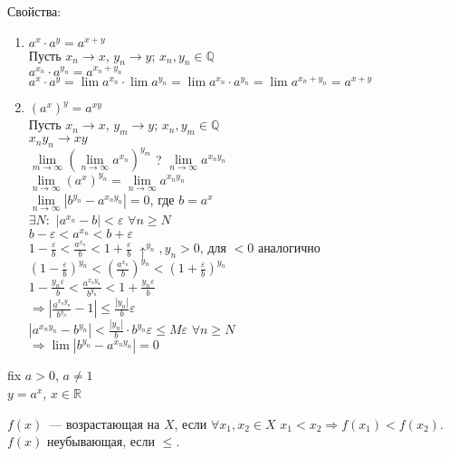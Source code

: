 \documentclass{article}
\begin{document}
	Свойства:
	\begin{enumerate}
		\item $a^x \cdot a^y = a^{x + y}$ \\
		Пусть $x_n \rightarrow x$, $y_n \rightarrow y$; $x_n, y_n \in \mathbb{Q}$ \\
		$a^{x_n} \cdot a^{y_n} = a^{x_n + y_n}$ \\
		$a^x \cdot a^y = \lim a^{x_n} \cdot \lim a^{y_n} = \lim a^{x_n} \cdot a^{y_n} = \lim a^{x_n + y_n} = a^{x + y}$
		\item $(a^x)^y = a^{xy}$ \\
		Пусть $x_n \rightarrow x$, $y_m \rightarrow y$; $x_n, y_m \in \mathbb{Q}$ \\
		$x_ny_n \rightarrow xy$ \\
		$\lim \limits_{m \rightarrow \infty} (\lim \limits_{n \rightarrow \infty} a^{x_n})^{y_m}$ ? $\lim \limits_{n \rightarrow \infty} a^{x_ny_n}$ \\
		$\lim \limits_{n \rightarrow \infty} (a^x)^{y_n} = \lim \limits_{n \rightarrow \infty} a^{x_ny_n}$ \\
		$\lim \limits_{n \rightarrow \infty} |b^{y_n} - a^{x_ny_n}| = 0$, где $b = a^x$ \\
		$\exists N:$ $|a^{x_n} - b| < \varepsilon$ $\forall n \geqslant N$ \\
		$b - \varepsilon < a^{x_n} < b + \varepsilon$ \\
		$1 - \frac{\varepsilon}{b} < \frac{a^{x_n}}{b} < 1 + \frac{\varepsilon}{b}$ $\uparrow ^{y_n}, y_n > 0$, для $< 0$ аналогично \\
		$(1 - \frac{\varepsilon}{b})^{y_n} < (\frac{a^{x_n}}{b})^{y_n} < (1 + \frac{\varepsilon}{b})^{y_n}$ \\
		$1 - \frac{y_n \varepsilon}{b} < \frac{a^{x_ny_n}}{b^{y_n}} < 1 + \frac{y_n \varepsilon}{b}$ \\
		$\Rightarrow |\frac{a^{x_ny_n}}{b^{y_n}} - 1| \leqslant \frac{|y_n|}{b} \varepsilon$ \\
		$|a^{x_ny_n} - b^{y_n}| < \frac{|y_n|}{b} \cdot b^{y_n} \varepsilon \leqslant M\varepsilon$ $\forall n \geqslant N$ \\
		$\Rightarrow \lim |b^{y_n} - a^{x_ny_n}| = 0$
	\end{enumerate}
	fix $a > 0$, $a \not= 1$ \\
	$y = a^x$, $x \in \mathbb{R}$
	\begin{definition}
		$f(x)$~--- возрастающая на $X$, если $\forall x_1, x_2 \in X$ $x_1 < x_2 \Rightarrow f(x_1) < f(x_2)$. $f(x)$ неубывающая, если $\leqslant$.
	\end{definition}
\end{document}
